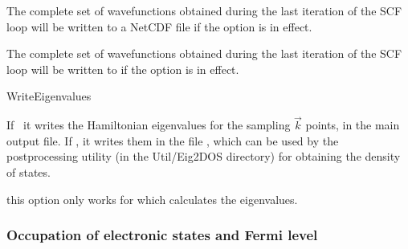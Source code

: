The complete set of wavefunctions obtained during the last
iteration of the SCF loop will be written to a NetCDF file
 if the  option is in effect.

The complete set of wavefunctions obtained during the last
iteration of the SCF loop will be written to 
if the  option is in effect.


\begin{fdflogicalF}{WriteEigenvalues}

  If \fdftrue\ it writes the Hamiltonian eigenvalues for the sampling
  $\vec k$ points, in the main output file.  If \fdffalse, it
  writes them in the file , which can be used
  by the 
  postprocessing utility (in the Util/Eig2DOS directory) for obtaining
  the density of states.

  \note this option only works for  which
  calculates the eigenvalues.

\end{fdflogicalF}


\subsubsection{Occupation of electronic states and Fermi level}
\label{electronic-occupation}


